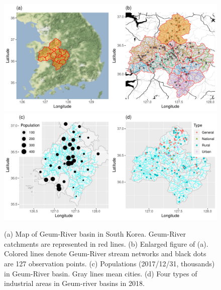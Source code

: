 \documentclass[11pt,titlepage]{article}
\begin{document}
\begin{figure}
	\centering\includegraphics[width=\textwidth]{Stream_result/Studyarea_small.pdf}\\
	\includegraphics[width=\textwidth]{Stream_result/Studyarea_additional.pdf}\caption{(a) Map of Geum-River basin in South Korea. Geum-River catchments are represented in red lines. (b) Enlarged figure of (a). Colored lines denote Geum-River stream networks and black dots are 127 observation points. (c) Populations (2017/12/31, thousands) in Geum-River basin. Gray lines mean cities. (d) Four types  of industrial areas in Geum-river basins in 2018.}
	\label{fig:studyarea}
\end{figure}


%
\end{document}
